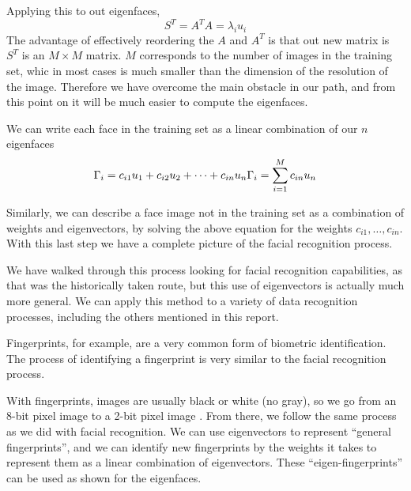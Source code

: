 \documentclass[12pt]{report}
\begin{document}
            Applying this to out eigenfaces,
                \[
                    S^T = A^T A = \lambda_i u_i
                \] 
            The advantage of effectively reordering the $A$ and $A^T$ is that out new matrix is $S^T$ is an $M \times M$ matrix. $M$ corresponds to the number of images in the training set, whic in most cases is much smaller than the dimension of the resolution of the image. Therefore we have overcome the main obstacle in our path, and from this point on it will be much easier to compute the eigenfaces.
            
            We can write each face in the training set as a linear combination of our $n$ eigenfaces 
                \[
                    \Gamma_i = c_{i1} u_1 + c_{i2} u_2 + \dots + c_{in} u_n \\
                    \Gamma_i = \sum_{i=1}^M c_{in} u_n
                \] 

            Similarly, we can describe a face image not in the training set as a combination of weights and eigenvectors, by solving the above equation for the weights $c_{i1},\dots,c_{in}$. With this last step we have a complete picture of the facial recognition process.

            We have walked through this process looking for facial recognition capabilities, as that was the historically taken route, but this use of eigenvectors is actually much more general. We can apply this method to a variety of data recognition processes, including the others mentioned in this report.

            Fingerprints, for example, are a very common form of biometric identification. The process of identifying a fingerprint is very similar to the facial recognition process.
            
            With fingerprints, images are usually black or white (no gray), so we go from an 8-bit pixel image to a 2-bit pixel image . From there, we follow the same process as we did with facial recognition. We can use eigenvectors to represent ``general fingerprints'', and we can identify new fingerprints by the weights it takes to represent them as a linear combination of eigenvectors. These ``eigen-fingerprints'' can be used as shown for the eigenfaces.
\end{document}
